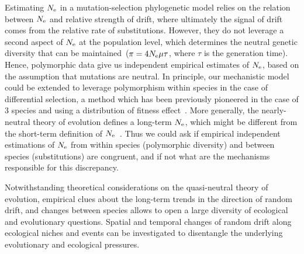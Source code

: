 Estimating $N_{\mathrm{e}}$ in a mutation-selection phylogenetic model relies on the relation between $N_{\mathrm{e}}$ and relative strength of drift, where ultimately the signal of drift comes from the relative rate of \glspl{substitution}.
However, they do not leverage a second aspect of $N_{\mathrm{e}}$ at the population level, which determines the \gls{neutral} genetic diversity that can be maintained~($\pi=4N_{\mathrm{e}} \mu \tau$, where $\tau$ is the generation time).
Hence, \gls{polymorphic} data give us independent empirical estimates of $N_{\mathrm{e}}$, based on the assumption that mutations are \gls{neutral}.
In principle, our mechanistic model could be extended to leverage polymorphism within species in the case of differential selection, a method which has been previously pioneered in the case of $3$ species and using a distribution of fitness effect~\citep{Wilson2011}.
More generally, the \gls{nearly-neutral} theory of evolution defines a long-term $N_{\mathrm{e}}$, which might be different from the short-term definition of $N_{\mathrm{e}}$~\citep{Platt2018}.
Thus we could ask if empirical independent estimations of $N_{\mathrm{e}}$ from within species (polymorphic diversity) and between species (\glspl{substitution}) are congruent, and if not what are the mechanisms responsible for this discrepancy.

Notwithstanding theoretical considerations on the quasi-neutral theory of evolution, empirical clues about the long-term trends in the direction of random drift, and changes between species allows to open a large diversity of ecological and evolutionary questions.
Spatial and temporal changes of random drift along ecological niches and events can be investigated to disentangle the underlying evolutionary and ecological pressures.

